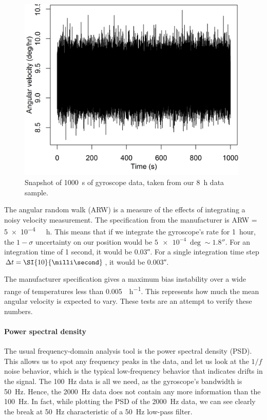 \begin{figure}[!ht]
		\centering
		\includegraphics[width=0.98\textwidth]{Figures/snapshot_11005.png} 
		\caption[\SI{1000}{\second} of gyroscope data]{Snapshot of \SI{1000}{\second} of gyroscope data, taken from our \SI{8}{\hour} data sample.}
		\label{fig:snapshot11005}
\end{figure}


The angular random walk (ARW) is a measure of the effects of integrating a noisy velocity measurement. The specification from the manufacturer is ARW = \SI{5e-4}{\deg{}\hour}. This means that if we integrate the gyroscope's rate for 1~hour, the $1-\sigma$ uncertainty on our position would be 
$\SI{5e-4}{\deg}\sim\ang{;;1.8}$. For an integration time of 1 second, it would be \ang{;;0.03}. For a single integration time step $\Deltat = \SI{10}{\milli\second}$, it would be \ang{;;0.003}. 

The manufacturer specification gives a maximum bias instability over a wide range of temperatures less than \SI{0.005}{\deg\per\hour}. This represents how much the mean angular velocity is expected to vary. These tests are an attempt to verify these numbers.


\paragraph{Power spectral density}

The usual frequency-domain analysis tool is the power spectral density (PSD). This allows us to spot any frequency peaks in the data, and let us look at the $1/f$ noise behavior, which is the typical low-frequency behavior that indicates drifts in the signal. The \SI{100}{\hertz} data is all we need, as the gyroscope's bandwidth is \SI{50}{\hertz}. Hence, the \SI{2000}{\hertz} data does not contain any more information than the \SI{100}{\hertz}. In fact, while plotting the PSD of the \SI{2000}{\hertz} data, we can see clearly the break at \SI{50}{\hertz} characteristic of a \SI{50}{\hertz} low-pass filter.

